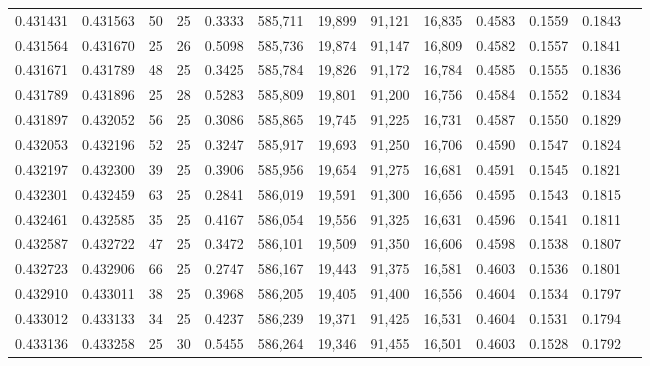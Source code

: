 \begin{tabular}{rrrrrrrrrrrrr}
0.431431 & 0.431563 &    50 &  25 &                                     0.3333 & 585,711 &  19,899 &  91,121 &  16,835 & 0.4583 & 0.1559 & 0.1843 \\
0.431564 & 0.431670 &    25 &  26 &                                     0.5098 & 585,736 &  19,874 &  91,147 &  16,809 & 0.4582 & 0.1557 & 0.1841 \\
0.431671 & 0.431789 &    48 &  25 &                                     0.3425 & 585,784 &  19,826 &  91,172 &  16,784 & 0.4585 & 0.1555 & 0.1836 \\
0.431789 & 0.431896 &    25 &  28 &                                     0.5283 & 585,809 &  19,801 &  91,200 &  16,756 & 0.4584 & 0.1552 & 0.1834 \\
0.431897 & 0.432052 &    56 &  25 &                                     0.3086 & 585,865 &  19,745 &  91,225 &  16,731 & 0.4587 & 0.1550 & 0.1829 \\
0.432053 & 0.432196 &    52 &  25 &                                     0.3247 & 585,917 &  19,693 &  91,250 &  16,706 & 0.4590 & 0.1547 & 0.1824 \\
0.432197 & 0.432300 &    39 &  25 &                                     0.3906 & 585,956 &  19,654 &  91,275 &  16,681 & 0.4591 & 0.1545 & 0.1821 \\
0.432301 & 0.432459 &    63 &  25 &                                     0.2841 & 586,019 &  19,591 &  91,300 &  16,656 & 0.4595 & 0.1543 & 0.1815 \\
0.432461 & 0.432585 &    35 &  25 &                                     0.4167 & 586,054 &  19,556 &  91,325 &  16,631 & 0.4596 & 0.1541 & 0.1811 \\
0.432587 & 0.432722 &    47 &  25 &                                     0.3472 & 586,101 &  19,509 &  91,350 &  16,606 & 0.4598 & 0.1538 & 0.1807 \\
0.432723 & 0.432906 &    66 &  25 &                                     0.2747 & 586,167 &  19,443 &  91,375 &  16,581 & 0.4603 & 0.1536 & 0.1801 \\
0.432910 & 0.433011 &    38 &  25 &                                     0.3968 & 586,205 &  19,405 &  91,400 &  16,556 & 0.4604 & 0.1534 & 0.1797 \\
0.433012 & 0.433133 &    34 &  25 &                                     0.4237 & 586,239 &  19,371 &  91,425 &  16,531 & 0.4604 & 0.1531 & 0.1794 \\
0.433136 & 0.433258 &    25 &  30 &                                     0.5455 & 586,264 &  19,346 &  91,455 &  16,501 & 0.4603 & 0.1528 & 0.1792 \\

\end{tabular}
